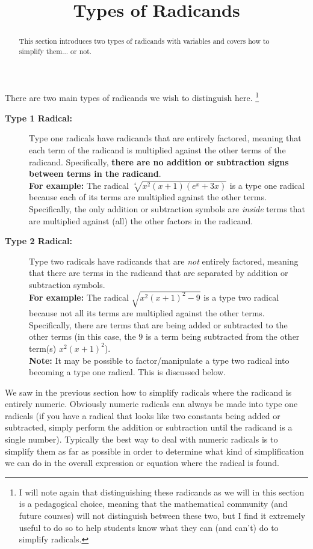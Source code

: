 \documentclass{ximeraXloud}
\title{Types of Radicands}
\begin{document}
\begin{abstract}
    This section introduces two types of radicands with variables and covers how to simplify them... or not.
\end{abstract}
\maketitle

There are two main types of radicands we wish to distinguish here.%
\footnote{%
    I will note again that distinguishing these radicands as we will in this section is a pedagogical choice, meaning that the mathematical community (and future courses) will not distinguish between these two, but I find it extremely useful to do so to help students know what they can (and can't) do to simplify radicals.%
    }

\begin{description}
    \item[\textbf{Type 1 Radical:}] Type one radicals have radicands that are entirely factored, meaning that each term of the radicand is multiplied against the other terms of the radicand. Specifically, \textbf{there are no addition or subtraction signs between terms in the radicand}.\\
    \textbf{For example:} The radical $\sqrt[4]{x^2(x+1)(e^x + 3x)}$ is a type one radical because each of its terms are multiplied against the other terms. Specifically, the only addition or subtraction symbols are \textit{inside} terms that are multiplied against (all) the other factors in the radicand.
    \item[\textbf{Type 2 Radical:}] Type two radicals have radicands that are \textit{not} entirely factored, meaning that there are terms in the radicand that are separated by addition or subtraction symbols.\\
    \textbf{For example:} The radical $\sqrt{x^2(x+1)^2 - 9}$ is a type two radical because not all its terms are multiplied against the other terms. Specifically, there are terms that are being added or subtracted to the other terms (in this case, the $9$ is a term being subtracted from the other term(s) $x^2(x+1)^2$).\\
    \textbf{Note:} It may be possible to factor/manipulate a type two radical into becoming a type one radical. This is discussed below.
\end{description}


We saw in the previous section how to simplify radicals where the radicand is entirely numeric. Obviously numeric radicals can always be made into type one radicals (if you have a radical that looks like two constants being added or subtracted, simply perform the addition or subtraction until the radicand is a single number). Typically the best way to deal with numeric radicals is to simplify them as far as possible in order to determine what kind of simplification we can do in the overall expression or equation where the radical is found.
\end{document}
